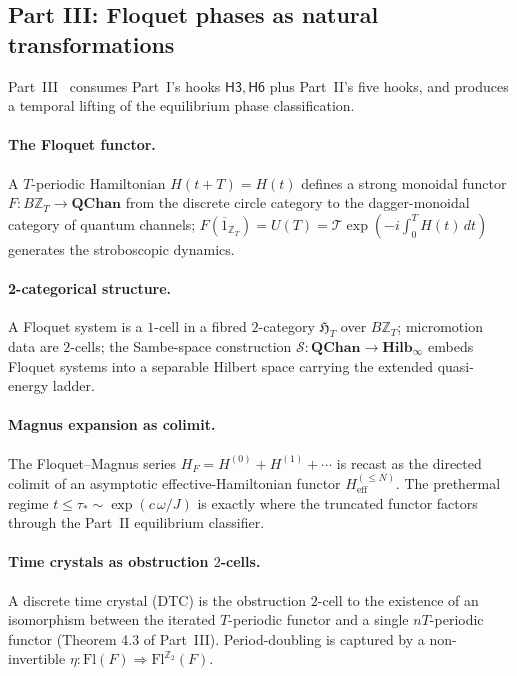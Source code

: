 \documentclass[12pt]{article}
\theoremstyle{definition}
\theoremstyle{remark}
\newcommand{\Hilb}{\mathbf{Hilb}}
\newcommand{\QChan}{\mathbf{QChan}}
\newcommand{\Z}{\mathbb{Z}}
\begin{document}
\subsection{Part III: Floquet phases as natural transformations}
\label{sec:recap-III}

Part~III~\cite{partIII} consumes Part~I's hooks $\mathsf{H3}, \mathsf{H6}$
plus Part~II's five hooks, and produces a temporal lifting of the equilibrium
phase classification.

\paragraph{The Floquet functor.} A $T$-periodic Hamiltonian $H(t+T) = H(t)$
defines a strong monoidal functor $F : B\Z_T \to \QChan$ from the discrete
circle category to the dagger-monoidal category of quantum channels;
$F(\overline{1}_{\Z_T}) = U(T) = \mathcal{T}\exp(-i \int_0^T H(t) \, dt)$
generates the stroboscopic dynamics.

\paragraph{2-categorical structure.} A Floquet system is a $1$-cell in a
fibred $2$-category $\mathfrak{H}_T$ over $B\Z_T$; micromotion data are
$2$-cells; the Sambe-space construction $\mathcal{S} : \QChan \to \Hilb_\infty$
embeds Floquet systems into a separable Hilbert space carrying the extended
quasi-energy ladder.

\paragraph{Magnus expansion as colimit.} The Floquet--Magnus series
$H_F = H^{(0)} + H^{(1)} + \cdots$ is recast as the directed colimit of an
asymptotic effective-Hamiltonian functor $H_{\text{eff}}^{(\leq N)}$. The
prethermal regime $t \leq \tau_* \sim \exp(c\,\omega/J)$ is exactly where the
truncated functor factors through the Part~II equilibrium classifier.

\paragraph{Time crystals as obstruction $2$-cells.} A discrete time crystal
(DTC) is the obstruction $2$-cell to the existence of an isomorphism between
the iterated $T$-periodic functor and a single $nT$-periodic functor
(Theorem 4.3 of Part~III). Period-doubling is captured by a non-invertible
$\eta : \mathrm{Fl}(F) \Rightarrow \mathrm{Fl}^{\Z_2}(F)$.
\end{document}
